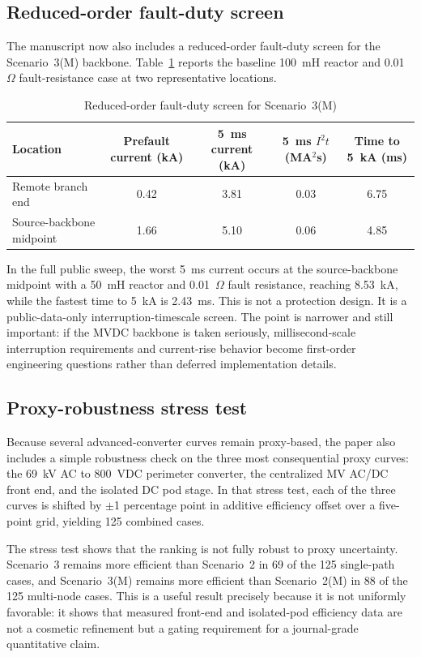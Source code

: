 \documentclass[11pt]{article}
\begin{document}
\subsection{Reduced-order fault-duty screen}
The manuscript now also includes a reduced-order fault-duty screen for the Scenario~3(M) backbone. Table~\ref{tab:faultscreen} reports the baseline 100~mH reactor and 0.01~$\Omega$ fault-resistance case at two representative locations.

\begin{table}[t]
    \centering
    \caption{Reduced-order fault-duty screen for Scenario~3(M)}
    \label{tab:faultscreen}
    \begin{tabular}{p{1.6in}cccc}
        \toprule
        Location & Prefault current (kA) & 5~ms current (kA) & 5~ms $I^2t$ (MA$^2$s) & Time to 5~kA (ms) \\
        \midrule
        Remote branch end & 0.42 & 3.81 & 0.03 & 6.75 \\
        Source-backbone midpoint & 1.66 & 5.10 & 0.06 & 4.85 \\
        \bottomrule
    \end{tabular}
\end{table}

In the full public sweep, the worst 5~ms current occurs at the source-backbone midpoint with a 50~mH reactor and 0.01~$\Omega$ fault resistance, reaching 8.53~kA, while the fastest time to 5~kA is 2.43~ms. This is not a protection design. It is a public-data-only interruption-timescale screen. The point is narrower and still important: if the MVDC backbone is taken seriously, millisecond-scale interruption requirements and current-rise behavior become first-order engineering questions rather than deferred implementation details.

\subsection{Proxy-robustness stress test}
Because several advanced-converter curves remain proxy-based, the paper also includes a simple robustness check on the three most consequential proxy curves: the 69~kV AC to 800~VDC perimeter converter, the centralized MV AC/DC front end, and the isolated DC pod stage. In that stress test, each of the three curves is shifted by $\pm$1 percentage point in additive efficiency offset over a five-point grid, yielding 125 combined cases.

The stress test shows that the ranking is not fully robust to proxy uncertainty. Scenario~3 remains more efficient than Scenario~2 in 69 of the 125 single-path cases, and Scenario~3(M) remains more efficient than Scenario~2(M) in 88 of the 125 multi-node cases. This is a useful result precisely because it is not uniformly favorable: it shows that measured front-end and isolated-pod efficiency data are not a cosmetic refinement but a gating requirement for a journal-grade quantitative claim.
\end{document}

